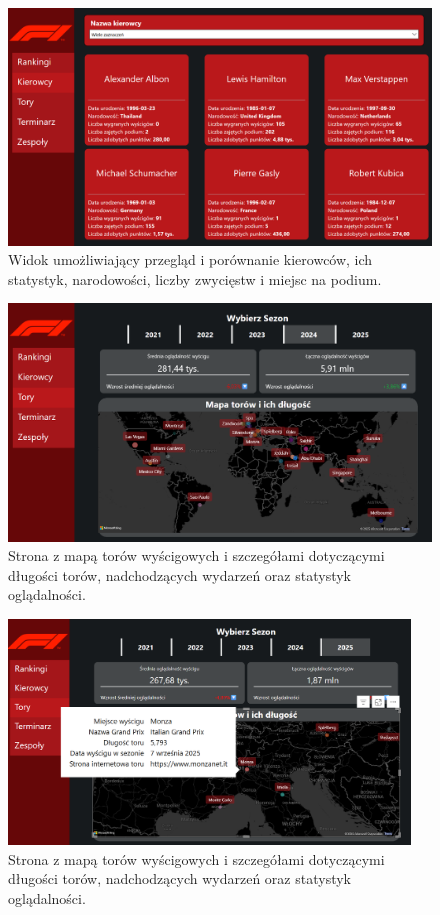 \documentclass[12pt]{article}
\begin{document}
\begin{figure}[H]
    \centering
\includegraphics[width=\textwidth]{raport2.png}
    \caption{Widok umożliwiający przegląd i porównanie kierowców, ich statystyk, narodowości, liczby zwycięstw i miejsc na podium.}
\end{figure}


\begin{figure}[H]
    \centering
\includegraphics[width=\textwidth]{raport3.png}
    \caption{Strona z mapą torów wyścigowych i szczegółami dotyczącymi długości torów, nadchodzących wydarzeń oraz statystyk oglądalności.}
\end{figure}

\begin{figure}[h!]
    \centering
    \includegraphics[width=0.95\textwidth]{ab.png}
    \caption{Strona z mapą torów wyścigowych i szczegółami dotyczącymi długości torów, nadchodzących wydarzeń oraz statystyk oglądalności.}
\end{figure}
\end{document}
